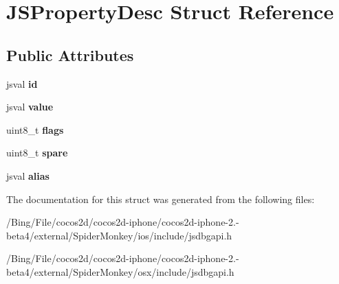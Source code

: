 \hypertarget{struct_j_s_property_desc}{\section{J\-S\-Property\-Desc Struct Reference}
\label{struct_j_s_property_desc}
}
\subsection*{Public Attributes}
\begin{DoxyCompactItemize}
\item 
\hypertarget{struct_j_s_property_desc_a9b837ea3cbb15382312e0a976869fd86}{jsval {\bfseries id}}\label{struct_j_s_property_desc_a9b837ea3cbb15382312e0a976869fd86}

\item 
\hypertarget{struct_j_s_property_desc_a348869ff5afff1c1617b1f40059e9b12}{jsval {\bfseries value}}\label{struct_j_s_property_desc_a348869ff5afff1c1617b1f40059e9b12}

\item 
\hypertarget{struct_j_s_property_desc_ad9341e20e3a01a2fc2cfa585b73de586}{uint8\-\_\-t {\bfseries flags}}\label{struct_j_s_property_desc_ad9341e20e3a01a2fc2cfa585b73de586}

\item 
\hypertarget{struct_j_s_property_desc_a5f1499e77b3231b517e5c6300ad10243}{uint8\-\_\-t {\bfseries spare}}\label{struct_j_s_property_desc_a5f1499e77b3231b517e5c6300ad10243}

\item 
\hypertarget{struct_j_s_property_desc_a2aeeaa999547f50d25f210627410007b}{jsval {\bfseries alias}}\label{struct_j_s_property_desc_a2aeeaa999547f50d25f210627410007b}

\end{DoxyCompactItemize}


The documentation for this struct was generated from the following files\-:\begin{DoxyCompactItemize}
\item 
/\-Bing/\-File/cocos2d/cocos2d-\/iphone/cocos2d-\/iphone-\/2.-\/beta4/external/\-Spider\-Monkey/ios/include/jsdbgapi.\-h\item 
/\-Bing/\-File/cocos2d/cocos2d-\/iphone/cocos2d-\/iphone-\/2.-\/beta4/external/\-Spider\-Monkey/osx/include/jsdbgapi.\-h\end{DoxyCompactItemize}
